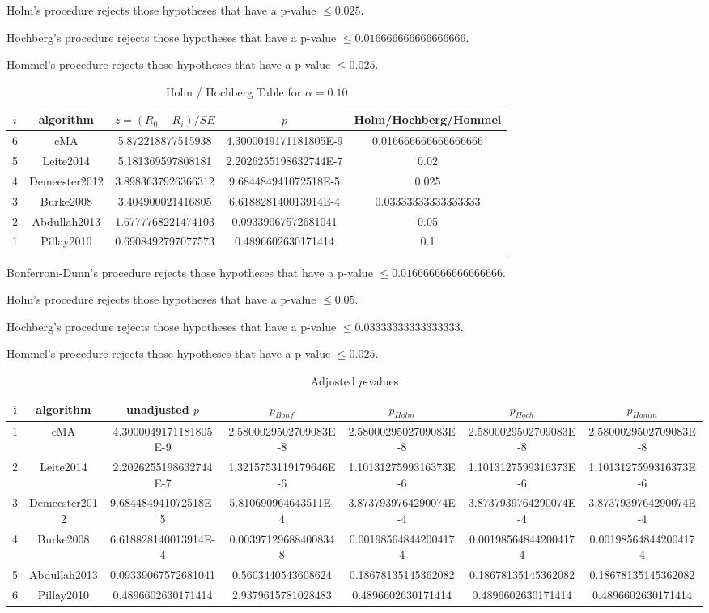 \documentclass[a4paper,10pt]{article}
\begin{document}
\begin{landscape}
Holm's procedure rejects those hypotheses that have a p-value $\le0.025$.


Hochberg's procedure rejects those hypotheses that have a p-value $\le0.016666666666666666$.


Hommel's procedure rejects those hypotheses that have a p-value $\le0.025$.


\begin{table}[!htp]
\centering\tiny
\caption{Holm / Hochberg Table for $\alpha=0.10$}
\begin{tabular}{ccccc}
$i$&algorithm&$z=(R_0 - R_i)/SE$&$p$&Holm/Hochberg/Hommel\\
\hline
6&cMA&5.872218877515938&4.3000049171181805E-9&0.016666666666666666\\
5&Leite2014&5.181369597808181&2.2026255198632744E-7&0.02\\
4&Demeester2012&3.8983637926366312&9.684484941072518E-5&0.025\\
3&Burke2008&3.404900021416805&6.618828140013914E-4&0.03333333333333333\\
2&Abdullah2013&1.6777768221474103&0.09339067572681041&0.05\\
1&Pillay2010&0.6908492797077573&0.4896602630171414&0.1\\
\hline
\end{tabular}
\end{table}
Bonferroni-Dunn's procedure rejects those hypotheses that have a p-value $\le0.016666666666666666$.


Holm's procedure rejects those hypotheses that have a p-value $\le0.05$.


Hochberg's procedure rejects those hypotheses that have a p-value $\le0.03333333333333333$.


Hommel's procedure rejects those hypotheses that have a p-value $\le0.025$.


\begin{table}[!htp]
\centering\tiny
\caption{Adjusted $p$-values}
\begin{tabular}{ccccccc}
i&algorithm&unadjusted $p$&$p_{Bonf}$&$p_{Holm}$&$p_{Hoch}$&$p_{Homm}$\\
\hline
1&cMA&4.3000049171181805E-9&2.5800029502709083E-8&2.5800029502709083E-8&2.5800029502709083E-8&2.5800029502709083E-8\\
2&Leite2014&2.2026255198632744E-7&1.3215753119179646E-6&1.1013127599316373E-6&1.1013127599316373E-6&1.1013127599316373E-6\\
3&Demeester2012&9.684484941072518E-5&5.810690964643511E-4&3.8737939764290074E-4&3.8737939764290074E-4&3.8737939764290074E-4\\
4&Burke2008&6.618828140013914E-4&0.003971296884008348&0.001985648442004174&0.001985648442004174&0.001985648442004174\\
5&Abdullah2013&0.09339067572681041&0.5603440543608624&0.18678135145362082&0.18678135145362082&0.18678135145362082\\
6&Pillay2010&0.4896602630171414&2.9379615781028483&0.4896602630171414&0.4896602630171414&0.4896602630171414\\
\hline
\end{tabular}
\end{table}


\end{landscape}
\end{document}
